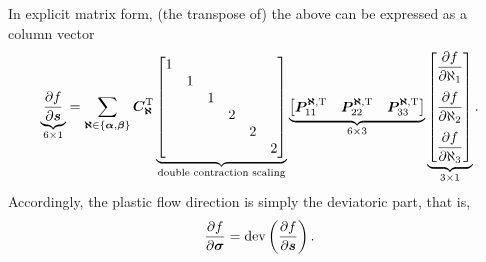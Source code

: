 In explicit matrix form, (the transpose of) the above can be expressed as a column vector
\begin{gather}
    \underbrace{\dfrac{\partial{f}}{\partial{\bm{s}}}}_{6\times1}=\sum_{\bm{\aleph}\in\{\bm{\alpha},\bm{\beta}\}}\bm{C}_{\bm{\aleph}}^{\mathrm{T}}\underbrace{\begin{bmatrix}
            1 &   &   &   &   &   \\
              & 1 &   &   &   &   \\
              &   & 1 &   &   &   \\
              &   &   & 2 &   &   \\
              &   &   &   & 2 &   \\
              &   &   &   &   & 2
        \end{bmatrix}}_{\text{double contraction scaling}}\underbrace{\begin{bmatrix}
            \bm{P}_{11}^{\bm{\aleph},\mathrm{T}} & \bm{P}_{22}^{\bm{\aleph},\mathrm{T}} & \bm{P}_{33}^{\bm{\aleph},\mathrm{T}}
        \end{bmatrix}}_{6\times3}\underbrace{\begin{bmatrix}
            \dfrac{\partial{f}}{\partial{\aleph_1}} \\[4mm] \dfrac{\partial{f}}{\partial{\aleph_2}} \\[4mm] \dfrac{\partial{f}}{\partial{\aleph_3}}
        \end{bmatrix}}_{3\times1}.
\end{gather}
Accordingly, the plastic flow direction is simply the deviatoric part, that is,
\begin{gather}
    \dfrac{\partial{f}}{\partial{\bm{\sigma}}}=\text{dev}\left(\dfrac{\partial{f}}{\partial{\bm{s}}}\right).
\end{gather}

